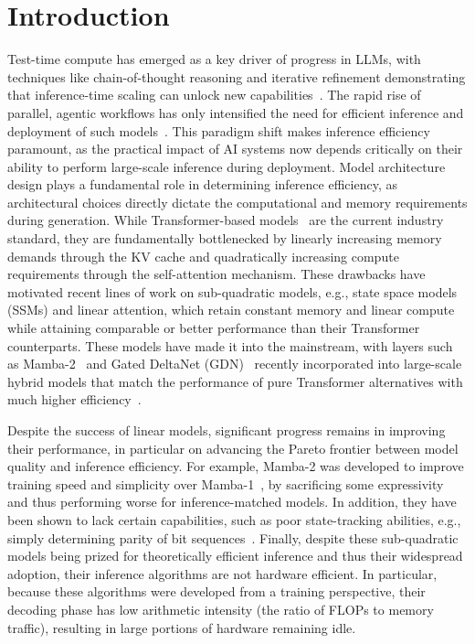 \section{Introduction}
Test-time compute has emerged as a key driver of progress in LLMs, with techniques like chain-of-thought reasoning and iterative refinement demonstrating that inference-time scaling can unlock new capabilities~\citep{wu2025inferencescalinglawsempirical,snell2024scalingllmtesttimecompute}.
The rapid rise of parallel, agentic workflows has only intensified the need for efficient inference and deployment of such models~\citep{openai_gpt53_codex_2026,anthropic_claude_opus_46_2026}.
This paradigm shift makes inference efficiency~\citep{kwon2023efficientmemorymanagementlarge,li2024llminferenceservingsurvey} paramount, as the practical impact of AI systems now depends critically on their ability to perform large-scale inference during deployment.
Model architecture design plays a fundamental role in determining inference efficiency, as architectural choices directly dictate the computational and memory requirements during generation.
While Transformer-based models~\citep{vaswani2017attention} are the current industry standard, they are fundamentally bottlenecked by linearly increasing memory demands through the KV cache and quadratically increasing compute requirements through the self-attention mechanism.
These drawbacks have motivated recent lines of work on sub-quadratic models, e.g., state space models (SSMs) and linear attention, which retain constant memory and linear compute while attaining comparable or better performance than their Transformer counterparts.
These models have made it into the mainstream, with layers such as Mamba-2~\citep{dao2024transformersssmsgeneralizedmodels} and Gated DeltaNet (GDN)~\citep{schlag2021deltarule,yang2025parallelizinglineartransformersdelta} recently incorporated into large-scale hybrid models that match the performance of pure Transformer alternatives with much higher efficiency~\citep{nvidia2025nemotronhfamilyaccurateefficient,qwen3technicalreport,kimiteam2025kimilinearexpressiveefficient,tencenthunyuanteam2025hunyuanturbosadvancinglargelanguage}.

Despite the success of linear models, significant progress remains in improving their performance, in particular on advancing the Pareto frontier between model quality and inference efficiency.
For example, Mamba-2 was developed to improve training speed and simplicity over Mamba-1~\citep{gu2024mambalineartimesequencemodeling}, by sacrificing some expressivity and thus performing worse for inference-matched models.
In addition, they have been shown to lack certain capabilities, such as poor state-tracking abilities, e.g., simply determining parity of bit sequences~\citep{grazzi2025unlockingstatetrackinglinearrnns,sarrof2024expressivecapacitystatespace}.
Finally, despite these sub-quadratic models being prized for theoretically efficient inference and thus their widespread adoption, their inference algorithms are not hardware efficient.
In particular, because these algorithms were developed from a training perspective, their decoding phase has low arithmetic intensity (the ratio of FLOPs to memory traffic), resulting in large portions of hardware remaining idle. 

